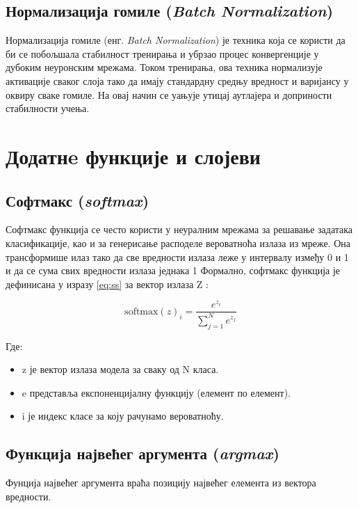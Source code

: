 \documentclass[a4paper, 12pt, master, utf8]{etf}
\begin{document}
\subsection{Нормализација гомиле (\textit{Batch Normalization})}

Нормализација гомиле (енг. \textit{Batch Normalization}) је техника која се користи да би се побољшала стабилност тренирања и убрзао процес конвергенције у дубоким неуронским мрежама. 
Током тренирања, ова техника нормализује активације сваког слоја тако да имају стандардну средњу вредност и варијансу у оквиру сваке гомиле.
На овај начин се уањује утицај аутлајера и доприности стабилности учења.


\section{Додатнe функције и слојеви}
\label{sec:26}

\subsection{Софтмакс (\textit{softmax})}

Софтмакс функција се често користи у неуралним мрежама за решавање задатака класификације, као и за генерисање расподеле вероватноћа излаза из мреже. 
Она трансформише илаз тако да све вредности излаза леже у интервалу између 0 и 1 и да се сума свих вредности излаза једнака 1 
Формално, софтмакс функција је дефинисана у изразу \ref{eq:ss} за вектор излаза Z :

\begin{equation}
    \label{eq:ss}
    \text{softmax}(z)_i = \frac{e^{z_i}}{\sum_{j=1}^{N} e^{z_j}}
\end{equation}

Где:

\begin{itemize}
    \item z је вектор излаза модела за сваку од N класа.
    \item e представља експоненцијалну функцију (елемент по елемент).
    \item i је индекс класе за коју рачунамо вероватноћу.
\end{itemize}


\subsection{Функција највећег аргумента (\textit{argmax})}
Фунција највећег аргумента враћа позицију највећег елемента из вектора вредности.
\end{document}
